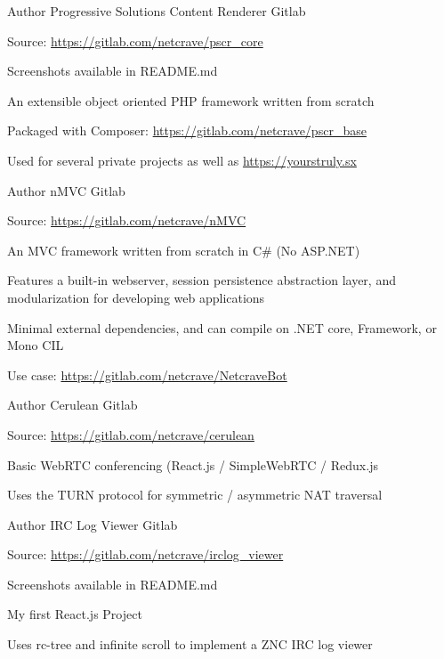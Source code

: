 
\begin{cventries}

  \cventry
    {Author}
    {Progressive Solutions Content Renderer}
    {Gitlab}
    {}
    {
      \begin{cvitems} 
        \item {Source: \url{https://gitlab.com/netcrave/pscr_core}}
        \item {Screenshots available in README.md}        
        \item {An extensible object oriented PHP framework written from scratch}
        \item {Packaged with Composer: \url{https://gitlab.com/netcrave/pscr_base}}
        \item {Used for several private projects as well as \url{https://yourstruly.sx}}        
      \end{cvitems}
    }
    
    \cventry
    {Author}
    {nMVC}
    {Gitlab}
    {}
    {
      \begin{cvitems} 
        \item {Source: \url{https://gitlab.com/netcrave/nMVC}}
        \item {An MVC framework written from scratch in C\# (No ASP.NET)}
        \item {Features a built-in webserver, session persistence abstraction layer, and modularization for developing web applications}
        \item {Minimal external dependencies, and can compile on .NET core, Framework, or Mono CIL}
        \item {Use case: \url{https://gitlab.com/netcrave/NetcraveBot}}        
      \end{cvitems}
    }

    \cventry
    {Author}
    {Cerulean}
    {Gitlab}
    {}
    {
      \begin{cvitems} 
        \item {Source: \url{https://gitlab.com/netcrave/cerulean}}
        \item {Basic WebRTC conferencing (React.js / SimpleWebRTC / Redux.js}
        \item {Uses the TURN protocol for symmetric / asymmetric NAT traversal}
      \end{cvitems}
    }

    \cventry
    {Author}
    {IRC Log Viewer}
    {Gitlab}
    {}
    {
      \begin{cvitems} 
        \item {Source: \url{https://gitlab.com/netcrave/irclog_viewer}}
        \item {Screenshots available in README.md}
        \item {My first React.js Project}
        \item {Uses rc-tree and infinite scroll to implement a ZNC IRC log viewer}
      \end{cvitems}
    }


\end{cventries}
